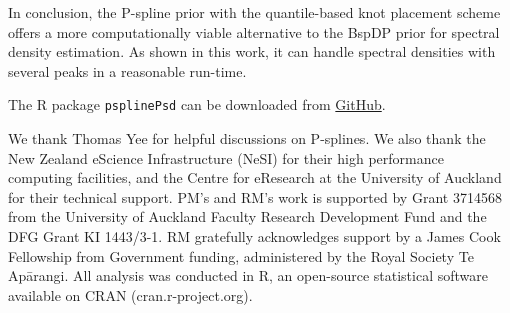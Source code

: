 \documentclass[twocolumn,final]{svjour3}
\begin{document}
In conclusion, the P-spline prior with the quantile-based knot placement scheme offers a more computationally viable alternative to the BspDP prior for spectral density estimation.  As shown in this work, it can handle spectral densities with several peaks in a reasonable run-time.

The \textsf{R} package \texttt{psplinePsd} can be downloaded from \href{https://github.com/pmat747/psplinePsd}{GitHub}.

\begin{acknowledgements}
We thank Thomas Yee for helpful discussions on P-splines.	
We also thank the New Zealand eScience Infrastructure (NeSI) for their high performance computing facilities, and the Centre for eResearch at the University of Auckland for their technical support. PM's and RM's work is supported by Grant 3714568 from the University of Auckland Faculty Research Development Fund and the DFG Grant KI 1443/3-1. RM gratefully acknowledges support by a James Cook Fellowship from Government funding, administered by the Royal Society Te Ap\={a}rangi.  All analysis was conducted in \textsf{R}, an open-source statistical software available on \textsf{CRAN} (cran.r-project.org).
\end{acknowledgements}



%

\end{document}
